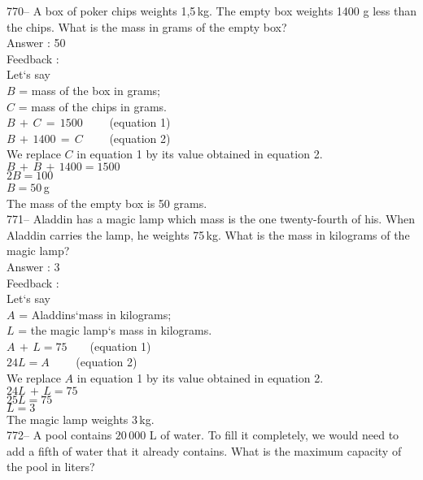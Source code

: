 \documentclass[letterpaper, 12pt]{article}
\begin{document}
770-- A box of poker chips weights 1,5\,kg. The empty box weights 1400 g less than the chips. What is the mass in grams of the empty box?\\

Answer : 50\\

Feedback : \\
Let`s say\\
$B$ = mass of the box in grams; \\
$C$ = mass of the chips in grams. \\

$B\,+\,C\,=\,1500 \qquad$ (equation 1)\\
$B\,+\,1400\,=\,C \qquad$ (equation 2)\\

We replace $C$ in equation 1 by its value obtained in equation 2.
\\
$B\,+\,B\,+\,1400=1500$\\
$2B=100$\\
$B=50$\,g\\
The mass of the empty box is 50 grams.\\

771-- Aladdin has a magic lamp which mass is the one twenty-fourth of his. When Aladdin carries the lamp, he weights 75\,kg. What is the mass in kilograms of the magic lamp?\\

Answer : 3\\

Feedback :\\
Let`s say\\
$A$ = Aladdins`mass in kilograms; \\
$L$ = the magic lamp`s mass in kilograms.\\

$A\,+\,L=75 \qquad $(equation 1)\\
$24L=A \qquad $ (equation 2)\\

We replace $A$ in equation 1 by its value obtained in equation 2.\\
$24L \,+\,L = 75$\\
$25L=75$\\
$L=3$\\
The magic lamp weights 3\,kg.\\

772-- A pool contains $20\,000$ L of water. To fill it completely, we would need to add a fifth of water that it already contains. What is the maximum capacity of the pool in liters? \\
\end{document}
